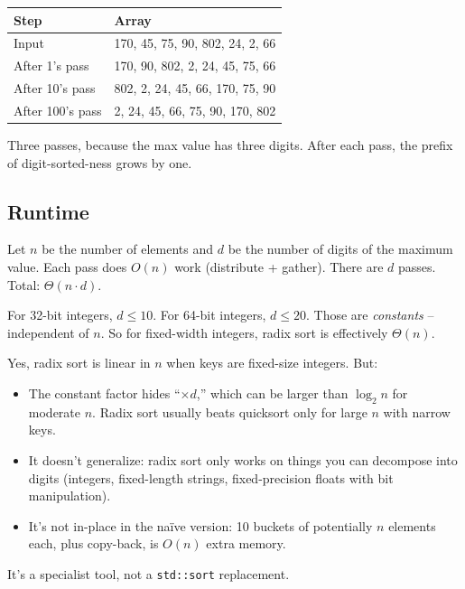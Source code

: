 \documentclass[11pt]{article}
\begin{document}
\begin{center}
\footnotesize
\renewcommand{\arraystretch}{1.3}
\begin{tabular}{@{}l|l@{}}
\hline
\textbf{Step} & \textbf{Array} \\
\hline
Input           & 170, 45, 75, 90, 802, 24, 2, 66 \\
After 1's pass  & 170, 90, 802, 2, 24, 45, 75, 66 \\
After 10's pass & 802, 2, 24, 45, 66, 170, 75, 90 \\
After 100's pass & 2, 24, 45, 66, 75, 90, 170, 802 \\
\hline
\end{tabular}
\end{center}

Three passes, because the max value has three digits. After each
pass, the prefix of digit-sorted-ness grows by one.

\subsection{Runtime}

\begin{ideabox}[$O(n \cdot d)$]
Let $n$ be the number of elements and $d$ be the number of digits
of the maximum value. Each pass does $O(n)$ work (distribute +
gather). There are $d$ passes. Total: $\Theta(n \cdot d)$.

For 32-bit integers, $d \le 10$. For 64-bit integers, $d \le 20$.
Those are \emph{constants} -- independent of $n$. So for fixed-width
integers, radix sort is effectively $\Theta(n)$.
\end{ideabox}

\begin{warnbox}
Yes, radix sort is linear in $n$ when keys are fixed-size integers.
But:
\begin{itemize}[leftmargin=*]
  \item The constant factor hides ``$\times d$,'' which can be
        larger than $\log_2 n$ for moderate $n$. Radix sort usually
        beats quicksort only for large $n$ with narrow keys.
  \item It doesn't generalize: radix sort only works on things you
        can decompose into digits (integers, fixed-length strings,
        fixed-precision floats with bit manipulation).
  \item It's not in-place in the na\"ive version: 10 buckets of
        potentially $n$ elements each, plus copy-back, is $O(n)$
        extra memory.
\end{itemize}
It's a specialist tool, not a \texttt{std::sort} replacement.
\end{warnbox}
\end{document}
